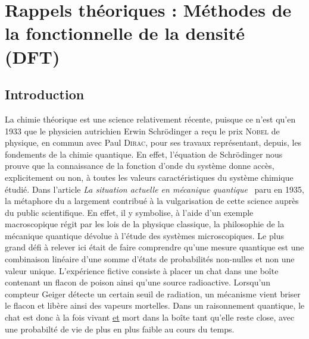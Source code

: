 \chapter[Rappels théoriques : DFT]{Rappels théoriques : Méthodes de la fonctionnelle de la densité (DFT)}
\minitoc
\restoregeometry

\newpage

\section*{Introduction}

La chimie théorique est une science relativement récente, puisque ce n'est qu'en 1933 que le physicien autrichien Erwin Schr\"{o}dinger  a reçu le prix \textsc{Nobel} de physique, en commun avec Paul \textsc{Dirac}, pour ses travaux représentant, depuis, les fondements de la chimie quantique. En effet, l'équation de Schr\"{o}dinger nous prouve que la connaissance de la fonction d'onde du système donne accès, explicitement ou non, à toutes les valeurs caractéristiques du système chimique étudié. Dans l'article \textit{La situation actuelle en mécanique quantique}~\cite{schrocat} paru en 1935, la métaphore du \og {} a largement contribué à la vulgarisation de cette science auprès du public scientifique. En effet, il y symbolise, à l'aide d'un exemple macroscopique régit par les lois de la physique classique, la philosophie de la mécanique quantique dévolue à l'étude des systèmes microscopiques. Le plus grand défi à relever ici était de faire comprendre qu'une \og mesure quantique \fg{} est une combinaison linéaire d'une somme d'états de probabilités non-nulles et non une valeur unique. L'expérience fictive consiste à placer un chat dans une boîte contenant un flacon de poison ainsi qu'une source radioactive. Lorsqu'un compteur Geiger détecte un certain seuil de radiation, un mécanisme vient briser le flacon et libère ainsi des vapeurs mortelles. Dans un raisonnement quantique, le chat est donc à la fois vivant \underline{et} mort dans la boîte tant qu'elle reste close, avec une probabilté de vie de plus en plus faible au cours du temps.

